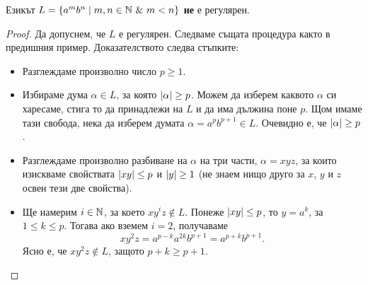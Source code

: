 \begin{example}
  Езикът $L = \{a^mb^n \mid m,n\in \Nat\ \&\ m < n\}$ {\bf не} е регулярен.
\end{example}
\begin{proof}
  Да допуснем, че $L$ е регулярен.
  Следваме същата процедура както в предишния пример.
  Доказателството следва стъпките:
  \begin{itemize}
  \item 
    Разглеждаме произволно число $p \geq 1$.
  \item
    Избираме дума $\alpha \in L$, за която $\lvert{\alpha}\rvert \geq p$. Можем да изберем каквото $\alpha$
    си харесаме, стига то да принадлежи на $L$ и да има дължина поне $p$.
    Щом имаме тази свобода, нека да изберем думата $\alpha = a^{p}b^{p+1} \in L$. Очевидно е, че $\lvert{\alpha}\rvert \geq p$.
  \item
    Разглеждаме произволно разбиване на $\alpha$ на три части, $\alpha = xyz$,
    за които изискваме свойствата $\lvert{xy}\rvert \leq p$ и $\lvert{y}\rvert \geq 1$ (не знаем нищо друго за $x$, $y$ и $z$ освен тези две свойства).
  \item
    Ще намерим $i\in\mathbb{N}$, за което $xy^iz \not\in L$.
    Понеже $\lvert{xy}\rvert \leq p$, то $y = a^k$, за  $1\leq k \leq p$.
    Тогава ако вземем $i = 2$, получаваме 
    \[xy^2z = a^{p-k}a^{2k}b^{p+1} = a^{p+k}b^{p+1}.\]
    Ясно е, че $xy^2z \not\in L$, защото $p+k \geq p+1$.
  \end{itemize}  
\end{proof}

